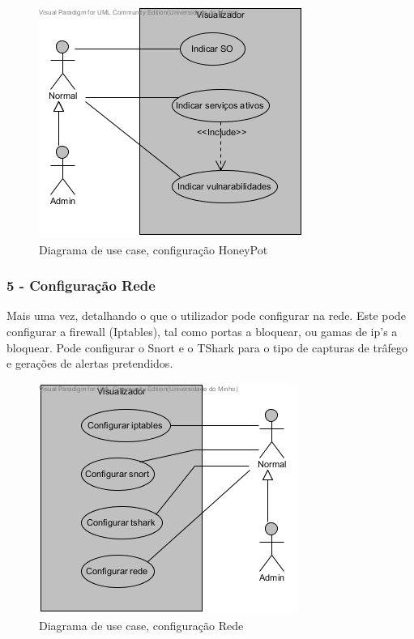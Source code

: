 \begin{figure}[!htb]
	\centering
	\includegraphics[scale=0.80]{images/ucs/ConfHoneyPot}
	\caption {Diagrama de use case, configuração HoneyPot}
\end{figure}
\pagebreak

\subsubsection{\textbf{5 - Configuração Rede}}

Mais uma vez, detalhando o que o utilizador pode configurar na rede. Este pode configurar a firewall (Iptables), tal como portas a bloquear, ou gamas
de ip's a bloquear. Pode configurar o Snort e o TShark para o tipo de capturas de trâfego e gerações de alertas pretendidos.

\begin{figure}[!htb]
	\centering
	\includegraphics[scale=0.80]{images/ucs/ConfRede}
	\caption {Diagrama de use case, configuração Rede}
\end{figure}
\pagebreak

